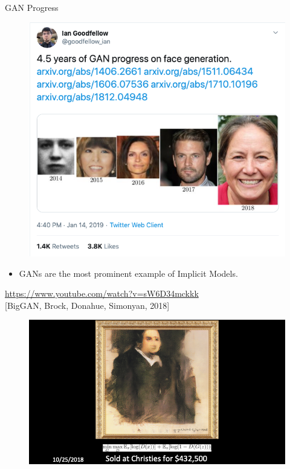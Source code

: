 \begin{frame}[allowframebreaks]{GAN Progress}
    \begin{figure}
        \centering
        \includegraphics[height=0.8\textheight,keepaspectratio]{images/gan/motivation-1.png}
    \end{figure}
    \begin{itemize}
        \item GANs are the most prominent example of Implicit Models.
    \end{itemize}

    \framebreak

    
    \centering
    \href{https://www.youtube.com/watch?v=sW6D34mckkk}{https://www.youtube.com/watch?v=sW6D34mckkk} \\
    \vspace{2cm}
    \raggedleft
    \small [BigGAN, Brock, Donahue, Simonyan, 2018]
    

    \framebreak

    \begin{figure}
        \centering
        \includegraphics[height=0.9\textheight,keepaspectratio]{images/gan/motivation-2.png}
    \end{figure}
\end{frame}